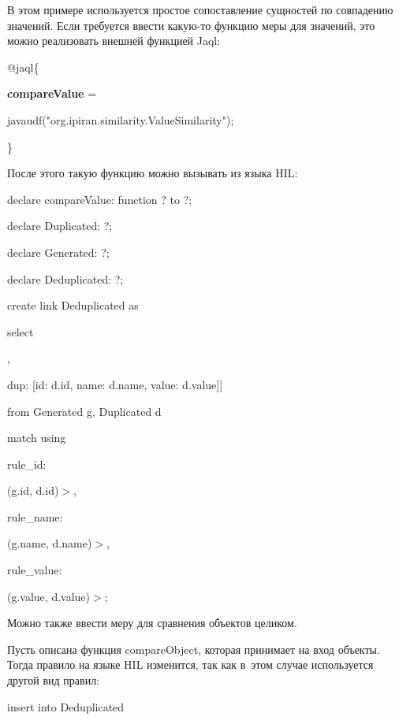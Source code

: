 \begin{multicols}{2}
  В этом примере используется простое сопо\-став\-ле\-ние сущностей по совпадению значений.
Если требуется ввести какую-то функцию меры для значений, это можно реализовать
внешней функцией Jaql:
{\sf

\noindent
  @jaql\{

\noindent
  {\textbf{compareValue}} =

  javaudf("org.ipiran.similarity.ValueSimilarity");

\noindent
  \}
  }

  После этого такую функцию можно вызывать из языка HIL:

{\sf
\noindent
  declare compareValue: function ? to ?;

\noindent
  declare Duplicated: ?;

\noindent
  declare Generated: ?;

\noindent
  declare Deduplicated: ?;

  \vspace*{6pt}

\noindent
  create link Deduplicated as

\noindent
  select

\noindent
  [gen: [id: g.id, name: g.name, value: g.value],

\noindent
  dup: [id: d.id, name: d.name, value: d.value]]

\noindent
  from Generated g, Duplicated d

\noindent
  match using

\noindent
  rule\_id:

\noindent
    (g.id, d.id)\;$>$,

\noindent
  rule\_name:

\noindent
    (g.name, d.name)\;$>$,

\noindent
  rule\_value:

\noindent
    (g.value, d.value)\;$>$;
    }

  Можно также ввести меру для сравнения объектов целиком.

  Пусть описана функция
{\sf compareObject}, которая принимает на вход объекты. Тогда правило на языке HIL
изменится, так как в~этом случае используется другой вид правил:

{\sf

\noindent
  insert into Deduplicated

}
\end{multicols}
